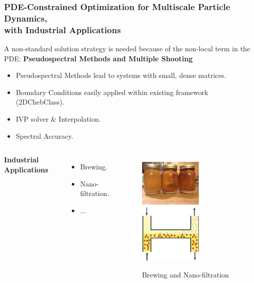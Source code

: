\documentclass[aspectratio=169,xcolor=dvipsnames]{beamer}
\begin{document}
\begin{frame}
\frametitle{PDE-Constrained Optimization \footnotesize{for Multiscale Particle Dynamics,\\ with Industrial Applications}}
A non-standard solution strategy is needed because of the non-local term in the PDE:
\newline
\newline
\textbf{Pseudospectral Methods and Multiple Shooting}
\begin{itemize}
	\item Pseudospectral Methods lead to systems with small, dense matrices.
	\item Boundary Conditions easily applied within existing framework (2DChebClass).
	\item IVP solver \& Interpolation.
	\item Spectral Accuracy.
\end{itemize}

\begin{columns}

\textbf{Industrial Applications}
\begin{itemize}
	\item Brewing.
	\item Nano-filtration.
	\item ...
\end{itemize}
	\vspace{-1cm}
	\begin{figure}
		\includegraphics[width=3cm]{beer.jpg} \ \ \ \ \ \ \ \ 
		\includegraphics[width=3cm]{Microfilter.png}
		\caption{Brewing and Nano-filtration}
	\end{figure}
\end{columns}
\end{frame}
\end{document}
